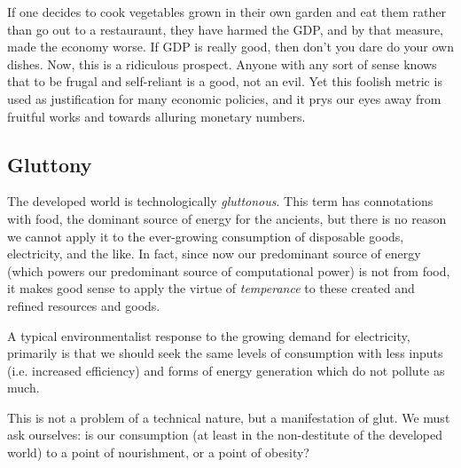 \documentclass[letterpaper]{article}
\begin{document}
If one decides to cook vegetables grown in their own garden and eat them rather than go out to a restauraunt, they have harmed the GDP, and by that measure, made the economy worse. If GDP is really good, then don't you dare do your own dishes. Now, this is a ridiculous prospect. Anyone with any sort of sense knows that to be frugal and self-reliant is a good, not an evil. Yet this foolish metric is used as justification for many economic policies, and it prys our eyes away from fruitful works and towards alluring monetary numbers.


\iffalse
\subsection{Gnosticism}

Seeing these disconnecting patterns, the other heresy has become apparent in our times as well: the \textit{gnostic} heresy: that material things are flawed, evil, or are in some sense inauthentic or a distraction. These heretics have been throroughly rebuked by such saints as Irenaeus.
\fi

\subsection{Gluttony}

The developed world is technologically \textit{gluttonous}. This term has connotations with food, the dominant source of energy for the ancients, but there is no reason we cannot apply it to the ever-growing consumption of disposable goods, electricity, and the like. In fact, since now our predominant source of energy (which powers our predominant source of computational power) is not from food, it makes good sense to apply the virtue of \textit{temperance} to these created and refined resources and goods.

A typical environmentalist response to the growing demand for electricity, primarily is that we should seek the same levels of consumption with less inputs (i.e. increased efficiency) and forms of energy generation which do not pollute as much.

This is not a problem of a technical nature, but a manifestation of glut. We must ask ourselves: is our consumption (at least in the non-destitute of the developed world) to a point of nourishment, or a point of obesity?

\end{document}
